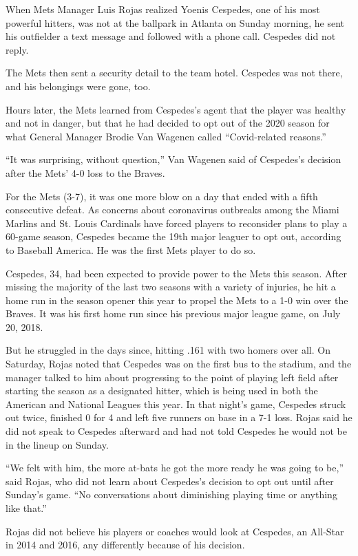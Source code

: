 When Mets Manager Luis Rojas realized Yoenis Cespedes, one of his most
powerful hitters, was not at the ballpark in Atlanta on Sunday morning,
he sent his outfielder a text message and followed with a phone call.
Cespedes did not reply.

The Mets then sent a security detail to the team hotel. Cespedes was not
there, and his belongings were gone, too.

Hours later, the Mets learned from Cespedes's agent that the player was
healthy and not in danger, but that he had decided to opt out of the
2020 season for what General Manager Brodie Van Wagenen called
``Covid-related reasons.''

``It was surprising, without question,'' Van Wagenen said of Cespedes's
decision after the Mets' 4-0 loss to the Braves.

For the Mets (3-7), it was one more blow on a day that ended with a
fifth consecutive defeat. As concerns about coronavirus outbreaks among
the Miami Marlins and St. Louis Cardinals have forced players to
reconsider plans to play a 60-game season, Cespedes became the 19th
major leaguer to opt out, according to Baseball America. He was the
first Mets player to do so.

Cespedes, 34, had been expected to provide power to the Mets this
season. After missing the majority of the last two seasons with a
variety of injuries, he hit a home run in the season opener this year to
propel the Mets to a 1-0 win over the Braves. It was his first home run
since his previous major league game, on July 20, 2018.

But he struggled in the days since, hitting .161 with two homers over
all. On Saturday, Rojas noted that Cespedes was on the first bus to the
stadium, and the manager talked to him about progressing to the point of
playing left field after starting the season as a designated hitter,
which is being used in both the American and National Leagues this year.
In that night's game, Cespedes struck out twice, finished 0 for 4 and
left five runners on base in a 7-1 loss. Rojas said he did not speak to
Cespedes afterward and had not told Cespedes he would not be in the
lineup on Sunday.

``We felt with him, the more at-bats he got the more ready he was going
to be,'' said Rojas, who did not learn about Cespedes's decision to opt
out until after Sunday's game. ``No conversations about diminishing
playing time or anything like that.''

Rojas did not believe his players or coaches would look at Cespedes, an
All-Star in 2014 and 2016, any differently because of his decision.

